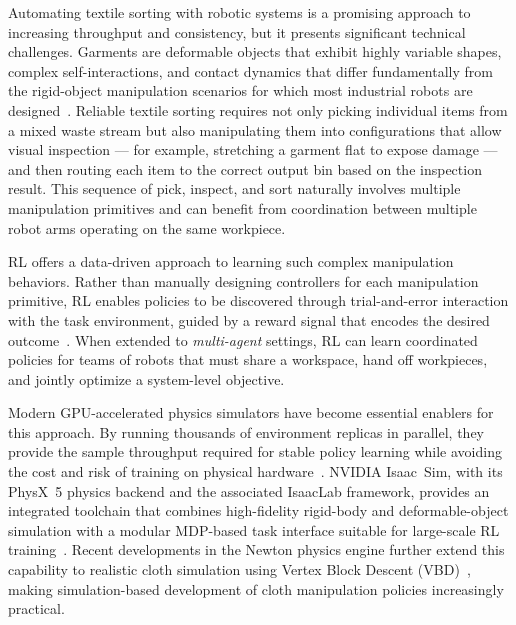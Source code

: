 Automating textile sorting with robotic systems is a promising approach to increasing throughput and consistency, but it presents significant technical challenges. Garments are deformable objects that exhibit highly variable shapes, complex self-interactions, and contact dynamics that differ fundamentally from the rigid-object manipulation scenarios for which most industrial robots are designed~\cite{Longhini2025ReviewClothManipulation}. Reliable textile sorting requires not only picking individual items from a mixed waste stream but also manipulating them into configurations that allow visual inspection --- for example, stretching a garment flat to expose damage --- and then routing each item to the correct output bin based on the inspection result. This sequence of pick, inspect, and sort naturally involves multiple manipulation primitives and can benefit from coordination between multiple robot arms operating on the same workpiece.

\ac{RL} offers a data-driven approach to learning such complex manipulation behaviors. Rather than manually designing controllers for each manipulation primitive, \ac{RL} enables policies to be discovered through trial-and-error interaction with the task environment, guided by a reward signal that encodes the desired outcome~\cite{SuttonBarto2018,Kober2013Survey}. When extended to \emph{multi-agent} settings, \ac{RL} can learn coordinated policies for teams of robots that must share a workspace, hand off workpieces, and jointly optimize a system-level objective.

Modern \ac{GPU}-accelerated physics simulators have become essential enablers for this approach. By running thousands of environment replicas in parallel, they provide the sample throughput required for stable policy learning while avoiding the cost and risk of training on physical hardware~\cite{Makoviychuk2021IsaacGym}. NVIDIA Isaac~Sim, with its PhysX~5 physics backend and the associated IsaacLab framework, provides an integrated toolchain that combines high-fidelity rigid-body and deformable-object simulation with a modular \ac{MDP}-based task interface suitable for large-scale \ac{RL} training~\cite{nvidia_isaac_sim_510_what_is,Mittal2025IsaacLab}. Recent developments in the Newton physics engine further extend this capability to realistic cloth simulation using Vertex Block Descent (\ac{VBD})~\cite{Chen2024VBD,nvidia_newton_announcement_2025}, making simulation-based development of cloth manipulation policies increasingly practical.

